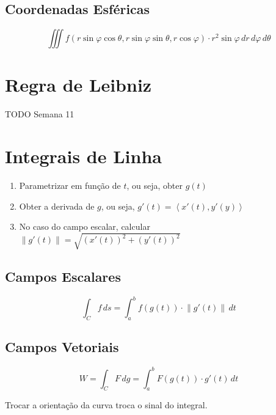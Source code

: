 \documentclass[11pt, a4paper]{article}
\begin{document}
\subsection{Coordenadas Esféricas}

\begin{equation*}
    \iiint f\left(r\sin\varphi\cos\theta, r\sin\varphi\sin\theta, r\cos\varphi\right) \cdot r^2\sin\varphi\,dr\,d\varphi\,d\theta
\end{equation*}

\section{Regra de Leibniz}

TODO Semana 11

\section{Integrais de Linha}

\begin{enumerate}
    \item Parametrizar em função de $t$, ou seja, obter $g(t)$
    \item Obter a derivada de $g$, ou seja, $g'(t) = \left\langle x'(t), y'(y)\right\rangle$
    \item No caso do campo escalar, calcular $\left\lVert g'(t) \right\rVert =
              \sqrt{\left(x'(t)\right)^2 + \left(y'(t)\right)^2}$
\end{enumerate}

\subsection{Campos Escalares}

\begin{equation*}
    \int_{C} f \, ds =
    \int_{a}^{b} f\left(g(t)\right) \cdot \left\lVert g'(t) \right\rVert  \, dt
\end{equation*}

\subsection{Campos Vetoriais}

\begin{equation*}
    W = \int_{C} F \, dg =
    \int_{a}^{b} F\left(g(t)\right) \cdot g'(t) \, dt
\end{equation*}

Trocar a orientação da curva troca o sinal do integral.
\end{document}
